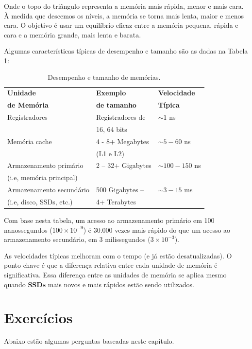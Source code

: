Onde o topo do triângulo representa a memória mais rápida, menor e mais cara. À medida que descemos os níveis, a memória se torna mais lenta, maior e menos cara. O objetivo é usar um equilíbrio eficaz entre a memória pequena, rápida e cara e a memória grande, mais lenta e barata.

Algumas características típicas de desempenho e tamanho são as dadas na Tabela \ref{tab:desempenho}:
\begin{table}[h]
	\centering
	\begin{tabular}{|l|l|l|}
		\hline
		\rowcolor[HTML]{C0C0C0} 
		\textbf{Unidade} & \textbf{Exemplo} & \textbf{Velocidade} \\ 
		\rowcolor[HTML]{C0C0C0} 
		\textbf{de Memória} & \textbf{de tamanho} & \textbf{Típica} \\ 
		Registradores & Registradores de  & $  \sim1 $ ns\\ 
		& 16, 64 bits &\\ \hline
		Memória cache & 4 - 8+ Megabytes  & $  \sim5-60 $ ns\\ 
		& (L1 e L2)& \\ \hline
		Armazenamento primário & 2 – 32+ Gigabytes & $  \sim100-150 $ ns\\ 
		 (i.e, memória principal) & &\\ \hline
		Armazenamento secundário  & 500 Gigabytes --  & $  \sim3-15 $ ms\\ 
		(i.e, disco, SSDs, etc.) & 4+ Terabytes& \\\hline
	\end{tabular}
	
	\caption{Desempenho e tamanho de memórias.}
	\label{tab:desempenho}
\end{table}

Com base nesta tabela, um acesso ao armazenamento primário em 100 nanossegundos
 ($ 100 \times 10^{-9} $) 
 é 30.000 vezes mais rápido do que um acesso ao armazenamento secundário, em 3 milissegundos ($3 \times 10^{-3}$).
 
 As velocidades típicas melhoram com o tempo (e já estão desatualizadas). O ponto chave é que a diferença relativa entre cada unidade de memória é significativa. Essa diferença entre as unidades de memória se aplica mesmo quando \textbf{SSDs} mais novos e mais rápidos estão sendo utilizados.

\section{Exercícios}
Abaixo estão algumas perguntas baseadas neste capítulo.

